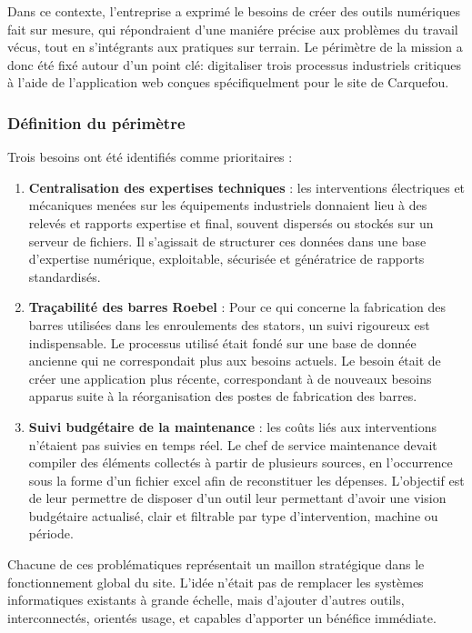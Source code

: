 \documentclass[11pt,a4paper]{article}
\begin{document}
Dans ce contexte, l'entreprise a exprimé le besoins de créer des outils numériques  fait sur mesure, qui répondraient d'une maniére précise aux problèmes du travail vécus, tout en s'intégrants aux pratiques sur terrain. Le périmètre de la mission a donc été fixé autour d'un point clé: digitaliser trois processus industriels critiques à l'aide de l'application web conçues spécifiquelment pour le site de Carquefou.

\subsubsection{Définition du périmètre}

Trois besoins ont été identifiés comme prioritaires :

\begin{enumerate}
    \item \textbf{Centralisation des expertises techniques} : les interventions électriques et mécaniques menées sur les équipements industriels donnaient lieu à des relevés et rapports expertise et final, souvent dispersés ou stockés sur un serveur de fichiers. Il s’agissait de structurer ces données dans une base d’expertise numérique, exploitable, sécurisée et génératrice de rapports standardisés.

    \item \textbf{Traçabilité des barres Roebel} : Pour ce qui concerne la fabrication des barres utilisées dans les enroulements des stators, un suivi rigoureux est indispensable. Le processus utilisé était fondé sur une base de donnée ancienne qui ne correspondait plus aux besoins actuels. Le besoin était de créer une application plus récente, correspondant à de nouveaux besoins apparus suite à la réorganisation des postes de fabrication des barres. 

    \item \textbf{Suivi budgétaire de la maintenance} : les coûts liés aux interventions n’étaient pas suivies en temps réel. Le chef de service maintenance devait compiler des éléments collectés à partir de plusieurs sources, en l’occurrence sous la forme d’un fichier excel afin de reconstituer les dépenses. L’objectif est de leur permettre de disposer d’un outil leur permettant d’avoir une vision budgétaire actualisé, clair et filtrable par type d’intervention, machine ou période.
\end{enumerate}

Chacune de ces problématiques représentait un maillon stratégique dans le fonctionnement global du site. L’idée n’était pas de remplacer les systèmes informatiques existants à grande échelle, mais d'ajouter d'autres outils, interconnectés, orientés usage, et capables d’apporter un bénéfice immédiate.
\end{document}
